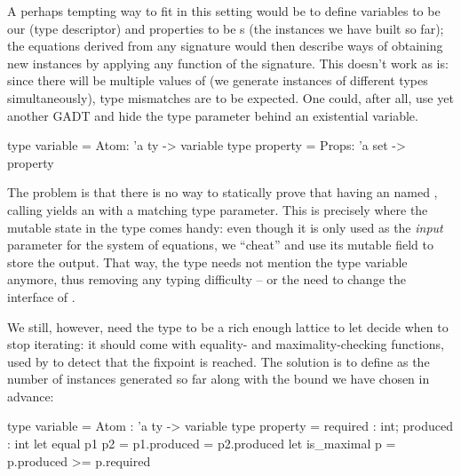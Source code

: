 A perhaps tempting way to fit in this setting would be to define variables to be
our  (type descriptor) and properties to be s (the
instances we have built so far); the equations derived from any signature would
then describe ways of obtaining new instances by applying any function of the
signature. This doesn't work as is: since there will be multiple values of
 (we generate instances of different types simultaneously), type
mismatches are to be expected. One could, after all, use yet another GADT and
hide the  type parameter behind an existential variable.
%
\begin{ocamlcode}
type variable = Atom: 'a ty -> variable
type property = Props: 'a set -> property
\end{ocamlcode}
%
The problem is that there is no way to statically prove that having an
 named , calling  yields an
 with a matching type parameter. This is precisely
where the mutable state in the  type comes handy: even though it is
only used as the \emph{input} parameter for the system of equations, we
``cheat'' and use its mutable  field to store the output. That way,
the  type needs not mention the type variable  anymore,
thus removing any typing difficulty -- or the need to change the interface of
.

We still, however, need the  type to be a rich enough lattice to
let  decide when to stop iterating: it should come with equality- and
maximality-checking functions, used by  to detect that the fixpoint is
reached. The solution is to define  as the number of instances
generated so far along with the bound we have chosen in advance:
%
\begin{ocamlcode}
type variable = Atom : 'a ty -> variable
type property = { required : int; produced : int }
let equal p1 p2 = p1.produced = p2.produced
let is_maximal p = p.produced >= p.required
\end{ocamlcode}
%
